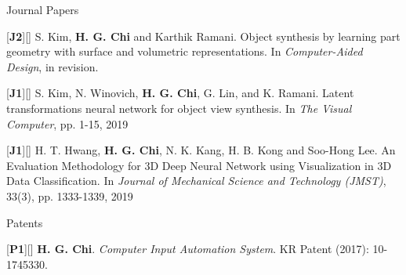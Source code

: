 \begin{cventries}

\cvpub
{Journal Papers} %
{ %
\begin{cvitems}
\item {[\textbf{J2}][\href{https://docs.google.com/viewer?url=https://github.com/stnoah1/CV/raw/master/documents/CAD.pdf}{}] S. Kim, \textbf{H. G. Chi} and Karthik Ramani. Object synthesis by learning part geometry with surface and volumetric representations. In \textit{Computer-Aided Design}, in revision.}
\item {[\textbf{J1}][\href{https://link.springer.com/article/10.1007/s00371-019-01755-x}{}] S. Kim, N. Winovich, \textbf{H. G. Chi}, G. Lin, and K. Ramani. Latent transformations neural network for object view synthesis. In \textit{The Visual Computer}, pp. 1-15, 2019}
\item {[\textbf{J1}][\href{https://link.springer.com/content/pdf/10.1007/s12206-019-0233-1.pdf}{}] H. T. Hwang, \textbf{H. G. Chi}, N. K. Kang, H. B. Kong and Soo-Hong Lee. An Evaluation Methodology for 3D Deep Neural Network using Visualization in 3D Data Classification. In \textit{Journal of Mechanical Science and Technology (JMST)}, 33(3), pp. 1333-1339, 2019}
\end{cvitems}
}


\cvpub
{Patents}{
\begin{cvitems}
\item {[\textbf{P1}][\href{https://docs.google.com/viewer?url=https://github.com/stnoah1/CV/raw/master/documents/patent.pdf}{}] \textbf{H. G. Chi}.  \textit{Computer Input Automation System}. KR Patent (2017): 10-1745330.}
\end{cvitems}
}



\end{cventries}
